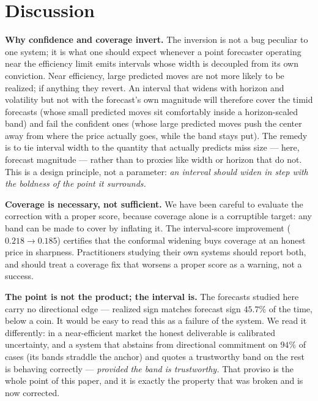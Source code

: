\documentclass[11pt,a4paper]{article}
\begin{document}
\section{Discussion}\label{sec:discussion}
\textbf{Why confidence and coverage invert.} The inversion is not a bug peculiar to
one system; it is what one should expect whenever a point forecaster operating near
the efficiency limit emits intervals whose width is decoupled from its own
conviction. Near efficiency, large predicted moves are not more likely to be realized;
if anything they revert. An interval that widens with horizon and volatility but not
with the forecast's own magnitude will therefore cover the timid forecasts (whose
small predicted moves sit comfortably inside a horizon-scaled band) and fail the
confident ones (whose large predicted moves push the center away from where the price
actually goes, while the band stays put). The remedy is to tie interval width to the
quantity that actually predicts miss size --- here, forecast magnitude --- rather than to
proxies like width or horizon that do not. This is a design principle, not a
parameter: \emph{an interval should widen in step with the boldness of the point it
surrounds.}

\textbf{Coverage is necessary, not sufficient.} We have been careful to evaluate the
correction with a proper score, because coverage alone is a corruptible target: any band
can be made to cover by inflating it. The interval-score improvement
($0.218\to0.185$) certifies that the conformal widening buys coverage at an honest
price in sharpness. Practitioners studying their own systems should report both, and
should treat a coverage fix that worsens a proper score as a warning, not a success.

\textbf{The point is not the product; the interval is.} The forecasts studied here
carry no directional edge --- realized sign matches forecast sign $45.7\%$ of the time,
below a coin. It would be easy to read this as a failure of the system. We read it
differently: in a near-efficient market the honest deliverable is calibrated
uncertainty, and a system that abstains from directional commitment on $94\%$ of cases
(its bands straddle the anchor) and quotes a trustworthy band on the rest is behaving
correctly --- \emph{provided the band is trustworthy.} That proviso is the whole point of
this paper, and it is exactly the property that was broken and is now corrected.

\end{document}
